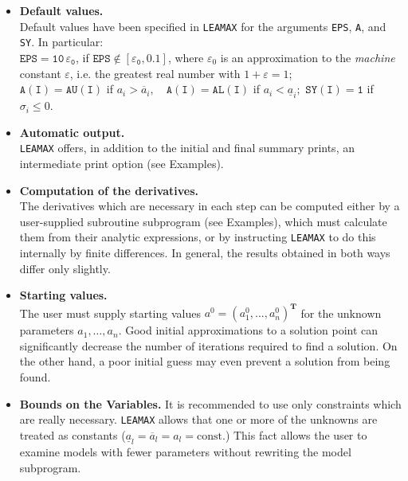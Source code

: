\begin{itemize}
\item {\bf Default values.} \\
Default values have been specified in {\tt LEAMAX} for the arguments
{\tt EPS}, {\tt A}, and {\tt SY}. In particular: \\
$\mathtt{EPS = 10\, \varepsilon_0}$, if
$\mathtt{EPS \notin [\varepsilon_0,0.1]}$, where $\varepsilon_0$ is an
approximation to the {\it machine} constant $\varepsilon$,
i.e. the greatest real number with $1+\varepsilon =1$; \\
$\mathtt{A(I) = AU(I)}$ if $a_i>\overline{a}_i, \quad
 \mathtt{A(I) = AL(I)}$ if $a_i<\underline{a}_i;$ \quad
$\mathtt{SY(I)=1}$ if $\sigma_i \le 0$.
\item {\bf Automatic output.} \\
{\tt LEAMAX} offers, in addition to the initial and final
summary prints, an intermediate print option (see Examples).
\item {\bf Computation of the derivatives.} \\
The derivatives which are necessary in each step can be computed either
by a user-supplied subroutine subprogram (see Examples), which must
calculate them from their analytic expressions,
or by instructing {\tt LEAMAX} to do this internally by
finite differences. In general, the results obtained in both ways
differ only slightly.
\item {\bf Starting values.} \\
The user must supply starting values
$a^0 = (a_1^0, \ldots ,a_n^0)^{\mathbf{T}}$ for the unknown parameters
$a_1,\ldots,a_n$.  Good initial approximations to a solution point can
significantly decrease the number of iterations required to find a
solution. On the other hand, a poor initial guess may even prevent a
solution from being found.
\item {\bf Bounds on the Variables.}
It is recommended to use only constraints which are really necessary.
{\tt LEAMAX} allows that one or more of the unknowns
are treated as constants
($\underline{a}_l=\overline{a}_l=a_l=\mathrm{const.}$)
This fact allows the user to examine models with fewer parameters
without rewriting the model subprogram.
\end{itemize}

